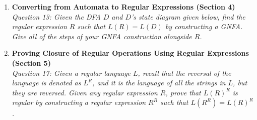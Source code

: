 \documentclass[10pt,letterpaper,unboxed,cm]{article}
\begin{document}
\begin{enumerate}
\pagebreak 

\item \textbf{Converting from Automata to Regular Expressions (Section 4)} \\
\emph{Question 13: Given the DFA $D$ and $D$'s state diagram given below, find the regular expression $R$ such that $L(R)=L(D)$ by constructing a GNFA. Give all of the steps of your GNFA construction alongside $R$.}


\pagebreak

\item \textbf{Proving Closure of Regular Operations Using Regular Expressions (Section 5)} \\
\emph{Question 17: Given a regular language $L$, recall that the reversal of the language is denoted as $L^R$, and it is the language of all the strings in $L$, but they are reversed. Given any regular expression $R$, prove that $L(R)^R$ is regular by constructing a regular expression $R^R$ such that $L(R^R) = L(R)^R$.}


\end{enumerate}
\end{document}
